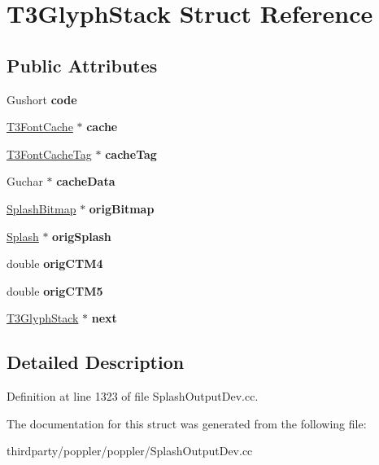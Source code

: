 \hypertarget{struct_t3_glyph_stack}{}\section{T3\+Glyph\+Stack Struct Reference}
\label{struct_t3_glyph_stack}
\subsection*{Public Attributes}
\begin{DoxyCompactItemize}
\item 
\mbox{\label{struct_t3_glyph_stack_ab4c2f79a026e23ad064e21373487697e}} 
Gushort {\bfseries code}
\item 
\mbox{\label{struct_t3_glyph_stack_a70b31c335b0bde2e020620cb3d90e634}} 
\hyperlink{class_t3_font_cache}{T3\+Font\+Cache} $\ast$ {\bfseries cache}
\item 
\mbox{\label{struct_t3_glyph_stack_aa56bf226fb057808fc1d17850d96548a}} 
\hyperlink{struct_t3_font_cache_tag}{T3\+Font\+Cache\+Tag} $\ast$ {\bfseries cache\+Tag}
\item 
\mbox{\label{struct_t3_glyph_stack_afb7ca99333afb4ade15d8134b9c0efc5}} 
Guchar $\ast$ {\bfseries cache\+Data}
\item 
\mbox{\label{struct_t3_glyph_stack_a71df0748484b2228d39890bd94e91339}} 
\hyperlink{class_splash_bitmap}{Splash\+Bitmap} $\ast$ {\bfseries orig\+Bitmap}
\item 
\mbox{\label{struct_t3_glyph_stack_a87f9dd3cc7ff6f238626b265c1edef6c}} 
\hyperlink{class_splash}{Splash} $\ast$ {\bfseries orig\+Splash}
\item 
\mbox{\label{struct_t3_glyph_stack_a090c49f9657c1344a03bb00f9cdafb93}} 
double {\bfseries orig\+C\+T\+M4}
\item 
\mbox{\label{struct_t3_glyph_stack_a45432b0113a4682961356d150e57a557}} 
double {\bfseries orig\+C\+T\+M5}
\item 
\mbox{\label{struct_t3_glyph_stack_a385b8c5d5a38579c4a6d211630da1640}} 
\hyperlink{struct_t3_glyph_stack}{T3\+Glyph\+Stack} $\ast$ {\bfseries next}
\end{DoxyCompactItemize}


\subsection{Detailed Description}


Definition at line 1323 of file Splash\+Output\+Dev.\+cc.



The documentation for this struct was generated from the following file\+:\begin{DoxyCompactItemize}
\item 
thirdparty/poppler/poppler/Splash\+Output\+Dev.\+cc\end{DoxyCompactItemize}
